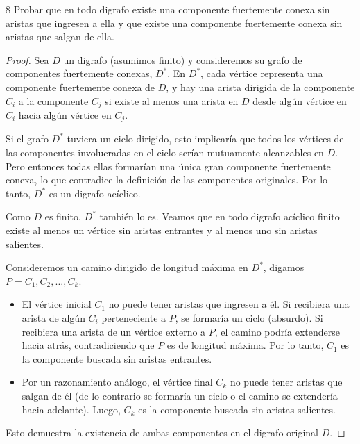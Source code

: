 \begin{ejercicioEntregar}{8}
	Probar que en todo digrafo existe una componente fuertemente conexa sin aristas que ingresen a ella y que existe una componente fuertemente conexa sin aristas que salgan de ella.
\end{ejercicioEntregar}
\begin{proof}
	Sea \( D \) un digrafo (asumimos finito) y consideremos su grafo de componentes fuertemente conexas, \( D^* \). En \( D^* \), cada vértice representa una componente fuertemente conexa de \( D \), y hay una arista dirigida de la componente \( C_i \) a la componente \( C_j \) si existe al menos una arista en \( D \) desde algún vértice en \( C_i \) hacia algún vértice en \( C_j \).

	Si el grafo \( D^* \) tuviera un ciclo dirigido, esto implicaría que todos los vértices de las componentes involucradas en el ciclo serían mutuamente alcanzables en \( D \). Pero entonces todas ellas formarían una única gran componente fuertemente conexa, lo que contradice la definición de las componentes originales. Por lo tanto, \( D^* \) es un digrafo acíclico.

	Como \( D \) es finito, \( D^* \) también lo es. Veamos que en todo digrafo acíclico finito existe al menos un vértice sin aristas entrantes y al menos uno sin aristas salientes.

	Consideremos un camino dirigido de longitud máxima en \( D^* \), digamos \( P = C_1, C_2, \ldots, C_k \).
	\begin{itemize}
		\item El vértice inicial \( C_1 \) no puede tener aristas que ingresen a él. Si recibiera una arista de algún \( C_i \) perteneciente a \( P \), se formaría un ciclo (absurdo). Si recibiera una arista de un vértice externo a \( P \), el camino podría extenderse hacia atrás, contradiciendo que \( P \) es de longitud máxima. Por lo tanto, \( C_1 \) es la componente buscada sin aristas entrantes.
		\item Por un razonamiento análogo, el vértice final \( C_k \) no puede tener aristas que salgan de él (de lo contrario se formaría un ciclo o el camino se extendería hacia adelante). Luego, \( C_k \) es la componente buscada sin aristas salientes.
	\end{itemize}

	Esto demuestra la existencia de ambas componentes en el digrafo original \( D \).
\end{proof}

\vspace{0.5cm}

